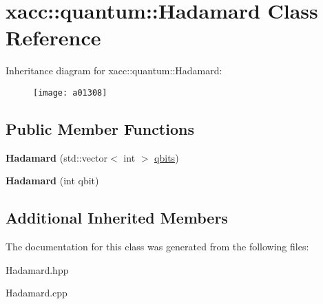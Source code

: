 \hypertarget{a01308}{}\section{xacc\+:\+:quantum\+:\+:Hadamard Class Reference}
\label{a01308}
Inheritance diagram for xacc\+:\+:quantum\+:\+:Hadamard\+:\begin{figure}[H]
\begin{center}
\leavevmode
\texttt{[image: a01308]}
\end{center}
\end{figure}
\subsection*{Public Member Functions}
\begin{DoxyCompactItemize}
\item 
\mbox{\label{a01308_a1f26925eeb4a52ca7e52dd9158fe7005}} 
{\bfseries Hadamard} (std\+::vector$<$ int $>$ \hyperlink{a01276_a2a56be6c2519ea65df4d06f4abae1393}{qbits})
\item 
\mbox{\label{a01308_aac4e06aae35583bcce39b6b178948364}} 
{\bfseries Hadamard} (int qbit)
\end{DoxyCompactItemize}
\subsection*{Additional Inherited Members}


The documentation for this class was generated from the following files\+:\begin{DoxyCompactItemize}
\item 
Hadamard.\+hpp\item 
Hadamard.\+cpp\end{DoxyCompactItemize}
